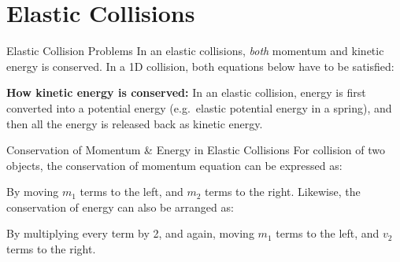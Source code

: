 \documentclass[12pt,compress,aspectratio=169]{beamer}
\begin{document}
\section{Elastic Collisions}

\begin{frame}{Elastic Collision Problems}
  In an elastic collisions, \emph{both} momentum and kinetic energy is
  conserved. In a 1D collision, both equations below have to be satisfied:

  \vspace{-.2in}{\large
    \begin{align*}
      \sum m_iv_i&=\sum m_iv_i'\\
      \sum\frac12 m_iv_i^2&=\sum\frac12 m_iv_i'^2
    \end{align*}
  }

  \textbf{How kinetic energy is conserved:} In an elastic collision, energy is
  first converted into a potential energy (e.g.\ elastic potential energy in a
  spring), and then all the energy is released back as kinetic energy.
\end{frame}



\begin{frame}{Conservation of Momentum \& Energy in Elastic Collisions}
  For collision of two objects, the conservation of momentum equation can be
  expressed as:


  By moving $m_1$ terms to the left, and $m_2$ terms to the right. Likewise,
  the conservation of energy can also be arranged as:


  By multiplying every term by 2, and again, moving $m_1$ terms to the left,
  and $v_2$ terms to the right.
\end{frame}
\end{document}

